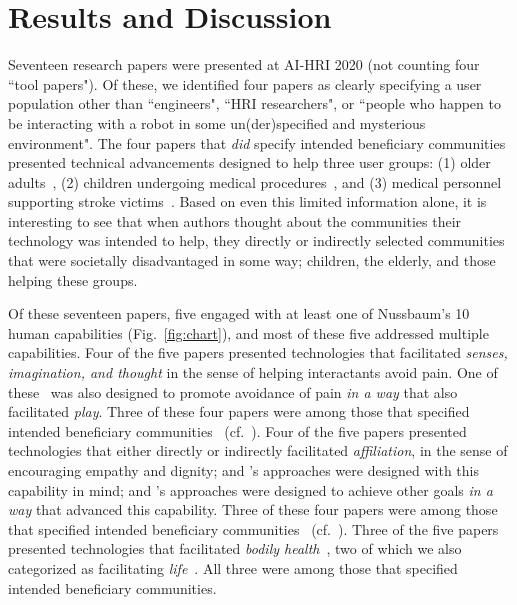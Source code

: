 \documentclass[letterpaper]{article} %
\begin{document}
\section{Results and Discussion}
Seventeen research papers were presented at AI-HRI 2020 (not counting four ``tool papers"). Of these, we identified four papers as clearly specifying a user population other than ``engineers", ``HRI researchers", or ``people who happen to be interacting with a robot in some un(der)specified and mysterious environment". The four papers that \textit{did} specify intended beneficiary communities presented technical advancements designed to help three user groups: (1) older adults~\cite{reneau2020supporting,wilson2020knowledge}, (2) children undergoing medical procedures~\cite{foster2020towards}, and (3) medical personnel supporting stroke victims~\cite{pourebadi2020stroke}. Based on even this limited information alone, it is interesting to see that when authors  thought about the communities their technology was intended to help, they directly or indirectly selected communities that were societally disadvantaged in some way; children, the elderly, and those helping these groups.



Of these seventeen papers, five engaged with at least one of Nussbaum's 10 human capabilities (Fig.~\ref{fig:chart}), and most of these five addressed multiple capabilities.
Four of the five papers presented technologies that facilitated \textit{senses, imagination, and thought} in the sense of helping interactants avoid pain. One of these~\cite{foster2020towards} was also designed to promote avoidance of pain \textit{in a way} that also facilitated \textit{play}. Three of these four papers were among those that specified intended beneficiary communities~\cite{reneau2020supporting,foster2020towards,pourebadi2020stroke} (cf.~\citet{jeong2020face}).
Four of the five papers presented technologies that either directly or indirectly facilitated \textit{affiliation}, in the sense of encouraging empathy and dignity; \citet{pourebadi2020stroke} and \citet{jeong2020face}'s approaches were designed with this capability in mind; \citet{reneau2020supporting} and \citet{wilson2020knowledge}'s approaches were designed to achieve other goals \textit{in a way} that advanced this capability. Three of these four papers were among those that specified intended beneficiary communities~\cite{reneau2020supporting,wilson2020knowledge,pourebadi2020stroke} (cf.~\citet{jeong2020face}).
Three of the five papers presented technologies that facilitated \textit{bodily health}~\cite{reneau2020supporting,wilson2020knowledge,pourebadi2020stroke}, two of which we also categorized as facilitating \textit{life}~\cite{wilson2020knowledge,pourebadi2020stroke}. All three were among those that specified intended beneficiary communities.
\end{document}
